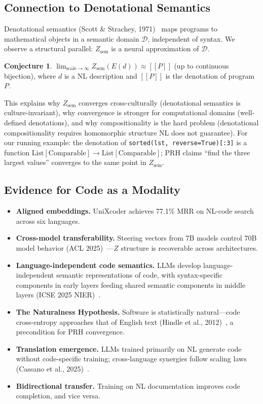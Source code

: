 \documentclass[11pt]{article}
\theoremstyle{definition}
\newtheorem{conjecture}{Conjecture}[section]
\newcommand{\Zsem}{Z_{\text{sem}}}
\begin{document}
\subsection{Connection to Denotational Semantics}

Denotational semantics (Scott \& Strachey, 1971)~\cite{scott1971semantics} maps programs to mathematical objects in a semantic domain $\mathcal{D}$, independent of syntax. We observe a structural parallel: $\Zsem$ is a neural approximation of $\mathcal{D}$.

\begin{conjecture}\label{conj:denotational}
$\lim_{\text{scale}\to\infty} \Zsem(E(d)) \approx [\![ P ]\!]$ (up to continuous bijection), where $d$ is a NL description and $[\![ P ]\!]$ is the denotation of program $P$.
\end{conjecture}

This explains why $\Zsem$ converges cross-culturally (denotational semantics is culture-invariant), why convergence is stronger for computational domains (well-defined denotations), and why compositionality is the hard problem (denotational compositionality requires homomorphic structure NL does not guarantee). For our running example: the denotation of \texttt{sorted(lst, reverse=True)[:3]} is a function $\text{List}[\text{Comparable}] \to \text{List}[\text{Comparable}]$; PRH claims ``find the three largest values'' converges to the same point in $\Zsem$.

\subsection{Evidence for Code as a Modality}\label{sec:evidence}

\begin{itemize}[nosep]
  \item \textbf{Aligned embeddings.} UniXcoder achieves 77.1\% MRR on NL-code search across six languages.
  \item \textbf{Cross-model transferability.} Steering vectors from 7B models control 70B model behavior (ACL 2025)~\cite{chen2025crossmodel}---$Z$ structure is recoverable across architectures.
  \item \textbf{Language-independent code semantics.} LLMs develop language-independent semantic representations of code, with syntax-specific components in early layers feeding shared semantic components in middle layers (ICSE 2025 NIER)~\cite{beyondsyntax2025}.
  \item \textbf{The Naturalness Hypothesis.} Software is statistically natural---code cross-entropy approaches that of English text (Hindle et al., 2012)~\cite{hindle2012naturalness}, a precondition for PRH convergence.
  \item \textbf{Translation emergence.} LLMs trained primarily on NL generate code without code-specific training; cross-language synergies follow scaling laws (Cassano et al., 2025)~\cite{cassano2025scaling}.
  \item \textbf{Bidirectional transfer.} Training on NL documentation improves code completion, and vice versa.
\end{itemize}
\end{document}
